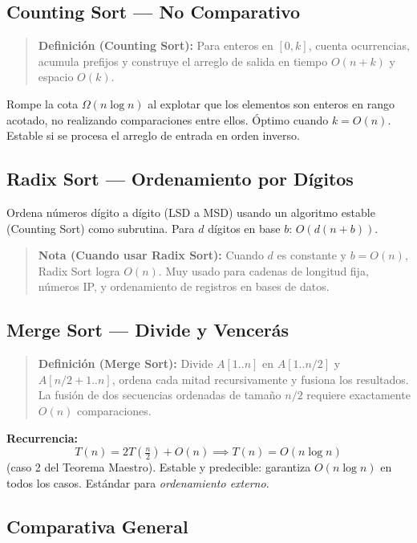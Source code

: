 \documentclass[12pt, letterpaper]{article}
\begin{document}
	\subsection{Counting Sort — No Comparativo}
	
	\begin{quote}
		\textbf{Definición (Counting Sort):}
		Para enteros en $[0, k]$, cuenta ocurrencias, acumula prefijos y construye el arreglo de salida en tiempo $O(n + k)$ y espacio $O(k)$.
	\end{quote}
	
	Rompe la cota $\Omega(n \log n)$ al explotar que los elementos son enteros en rango acotado, no realizando comparaciones entre ellos. Óptimo cuando $k = O(n)$. Estable si se procesa el arreglo de entrada en orden inverso.
	
	\subsection{Radix Sort — Ordenamiento por Dígitos}
	
	Ordena números dígito a dígito (LSD a MSD) usando un algoritmo estable (Counting Sort) como subrutina. Para $d$ dígitos en base $b$: $O(d(n+b))$.
	
	\begin{quote}
		\textbf{Nota (Cuando usar Radix Sort):}
		Cuando $d$ es constante y $b = O(n)$, Radix Sort logra $O(n)$. Muy usado para cadenas de longitud fija, números IP, y ordenamiento de registros en bases de datos.
	\end{quote}
	
	\subsection{Merge Sort — Divide y Vencerás}
	
	\begin{quote}
		\textbf{Definición (Merge Sort):}
		Divide $A[1..n]$ en $A[1..n/2]$ y $A[n/2+1..n]$, ordena cada mitad recursivamente y fusiona los resultados. La fusión de dos secuencias ordenadas de tamaño $n/2$ requiere exactamente $O(n)$ comparaciones.
	\end{quote}
	
	\textbf{Recurrencia:}
	\[
	T(n) = 2T\!\left(\tfrac{n}{2}\right) + O(n) \implies T(n) = O(n \log n)
	\]
	(caso 2 del Teorema Maestro). Estable y predecible: garantiza $O(n \log n)$ en todos los casos. Estándar para \textit{ordenamiento externo}.
	
	\subsection{Comparativa General}
	
\end{document}
